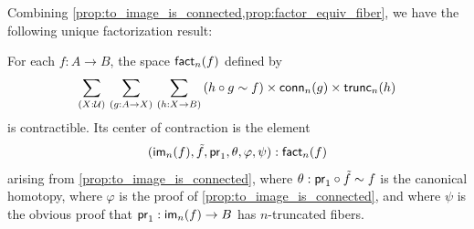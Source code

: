 
Combining \cref{prop:to_image_is_connected,prop:factor_equiv_fiber}, we have the following unique factorization result:

\begin{thm}\label{thm:orth-fact}
For each $f:A\to B$, the space $\mathsf{fact}_n(f)$ defined by
\begin{equation*}
\sm{X:\type}{g:A\to X}{h:X\to B} (h\circ g\htpy f)\times\mathsf{conn}_n(g)\times\mathsf{trunc}_n(h)
\end{equation*}
is contractible.
Its center of contraction is the element
\begin{equation*}
{\mathopen{}(\ensuremath{\mathsf{im}}_n(f),\tilde{f},\ensuremath{\mathsf{pr}_{1}},\theta,\varphi,\psi)\mathclose{}}:\mathsf{fact}_n(f)
\end{equation*}
arising from \cref{prop:to_image_is_connected},
where $\theta:\mathsf{pr}_{1}\circ\tilde{f}\sim f$ is the canonical homotopy, where $\varphi$ is the proof of
\cref{prop:to_image_is_connected}, and where $\psi$ is the obvious proof that $\mathsf{pr}_{1}:\mathsf{im}_n(f)\to B$ has $n$-truncated fibers.
\end{thm}

